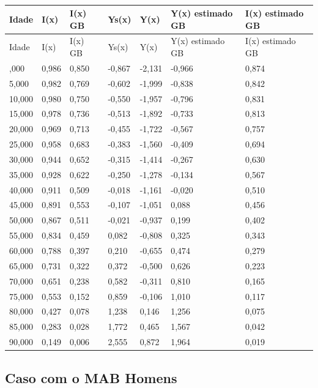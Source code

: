 \documentclass[
  12pt,
  a4paper,
]{scrreprt}
\begin{document}
\begin{longtable}[]{@{}lllllll@{}}
\caption{}\label{T_dd803}\tabularnewline
\toprule\noalign{}
Idade & I(x) & I(x) GB & Ys(x) & Y(x) & Y(x) estimado GB & I(x) estimado
GB \\
\midrule\noalign{}
\endfirsthead
\toprule\noalign{}
Idade & I(x) & I(x) GB & Ys(x) & Y(x) & Y(x) estimado GB & I(x) estimado
GB \\
\midrule\noalign{}
\endhead
\bottomrule\noalign{}
\endlastfoot
1,000 & 0,986 & 0,850 & -0,867 & -2,131 & -0,966 & 0,874 \\
5,000 & 0,982 & 0,769 & -0,602 & -1,999 & -0,838 & 0,842 \\
10,000 & 0,980 & 0,750 & -0,550 & -1,957 & -0,796 & 0,831 \\
15,000 & 0,978 & 0,736 & -0,513 & -1,892 & -0,733 & 0,813 \\
20,000 & 0,969 & 0,713 & -0,455 & -1,722 & -0,567 & 0,757 \\
25,000 & 0,958 & 0,683 & -0,383 & -1,560 & -0,409 & 0,694 \\
30,000 & 0,944 & 0,652 & -0,315 & -1,414 & -0,267 & 0,630 \\
35,000 & 0,928 & 0,622 & -0,250 & -1,278 & -0,134 & 0,567 \\
40,000 & 0,911 & 0,509 & -0,018 & -1,161 & -0,020 & 0,510 \\
45,000 & 0,891 & 0,553 & -0,107 & -1,051 & 0,088 & 0,456 \\
50,000 & 0,867 & 0,511 & -0,021 & -0,937 & 0,199 & 0,402 \\
55,000 & 0,834 & 0,459 & 0,082 & -0,808 & 0,325 & 0,343 \\
60,000 & 0,788 & 0,397 & 0,210 & -0,655 & 0,474 & 0,279 \\
65,000 & 0,731 & 0,322 & 0,372 & -0,500 & 0,626 & 0,223 \\
70,000 & 0,651 & 0,238 & 0,582 & -0,311 & 0,810 & 0,165 \\
75,000 & 0,553 & 0,152 & 0,859 & -0,106 & 1,010 & 0,117 \\
80,000 & 0,427 & 0,078 & 1,238 & 0,146 & 1,256 & 0,075 \\
85,000 & 0,283 & 0,028 & 1,772 & 0,465 & 1,567 & 0,042 \\
90,000 & 0,149 & 0,006 & 2,555 & 0,872 & 1,964 & 0,019 \\
\end{longtable}

\subsection{Caso com o MAB Homens}\label{caso-com-o-mab-homens}
\end{document}
